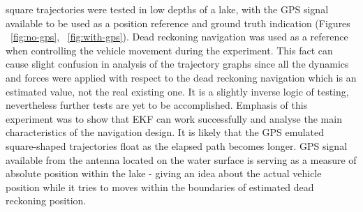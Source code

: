 \begin{figure}%
  \centering
\end{figure}

 square trajectories were tested in low depths of a lake, with the GPS signal available to be used as a position reference and ground truth indication (Figures ~\ref{fig:no-gps}, ~\ref{fig:with-gps}). Dead reckoning navigation was used as a reference when controlling the vehicle movement during the experiment. This fact can cause slight confusion in analysis of the trajectory graphs since all the dynamics and forces were applied with respect to the dead reckoning navigation which is an estimated value, not the real existing one. It is a slightly inverse logic of testing, nevertheless further tests are yet to be accomplished. Emphasis of this experiment was to show that EKF can work successfully and analyse the main characteristics of the navigation design. It is likely that the GPS emulated square-shaped trajectories float as the elapsed path becomes longer. GPS signal available from the antenna located on the water surface is serving as a measure of absolute position within the lake - giving an idea about the actual vehicle position while it tries to moves within the boundaries of estimated dead reckoning position. 

